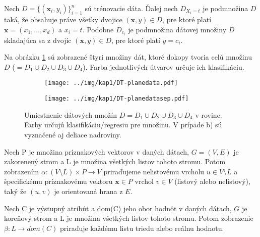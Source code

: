 \begin{def-sk}\label{kap1:2.3:2.3.2:subsetValueData}
Nech $D = \{(\mathbf{x}_{i},y_{i})\}_{i=1}^{n}$ sú trénovacie dáta. Ďalej nech $D_{X_{i} = t}$ je podmnožina $D$ taká, že obsahuje práve všetky dvojice $(\mathbf{x},y) \in D$, pre ktoré platí $\mathbf{x} = (x_{1}, \ldots, x_{d})$ a $x_{i} = t$. Podobne $D_{c_{i}}$ je podmnožina dátovej množiny $D$ skladajúca sa z dvojíc $(\mathbf{x},y) \in D$, pre ktoré platí $y = c_{i}$.
\end{def-sk}

Na obrázku \ref{fig:decisionPlaneDataa} sú zobrazené štyri množiny dát, ktoré dokopy tvoria celú množinu $D$ ($=D_{1} \cup D_{2} \cup D_{3} \cup D_{4}$). Farba jednotlivých útvarov určuje ich klasifikáciu.
 
\begin{figure}[h]
\centering
\begin{subfigure}[b]{0.45\textwidth}
\texttt{[image: ../img/kap1/DT-planedata.pdf]}
\caption{}\label{fig:decisionPlaneDataa}
\end{subfigure}
\qquad
\begin{subfigure}[b]{0.45\textwidth}
\texttt{[image: ../img/kap1/DT-planedatasep.pdf]}
\caption{}\label{fig:decisionPlaneDatab}
\end{subfigure}
\caption{Umiestnenie dátových množín $D = D_{1} \cup D_{2} \cup D_{3} \cup D_{4}$ v rovine. Farby určujú klasifikáciu/regresiu pre množinu. V prípade b) sú vyznačené aj deliace nadroviny.}\label{fig:decisionPlaneData}
\end{figure}

\begin{def-sk}\label{kap1:2.3:2.3.2:mapovanievrcholov}
Nech P je množina príznakových vektorov v daných dátach, $G = (V,E)$ je zakorenený strom a L je množina všetkých listov tohoto stromu. Potom zobrazením $\alpha:(V \setminus L) \times P \rightarrow V$ priraďujeme nelistovému vrcholu $u \in V \setminus L$ a špecifickému príznakovému vektoru $\mathbf{x} \in P$ vrchol $v \in V$ (listový alebo nelistový), taký že $(u,v)$ je orientovaná hrana z $E$.
\end{def-sk}

\begin{def-sk}\label{kap1:2.3:2.3.2:mapovanielistov}
Nech C je výstupný atribút a dom(C) jeho obor hodnôt v daných dátach, $G$ je koreňový strom a L je množina všetkých listov tohoto stromu. Potom zobrazenie $\beta:L \rightarrow dom(C)$ priraďuje každému listu triedu alebo reálnu hodnotu.
\end{def-sk}

